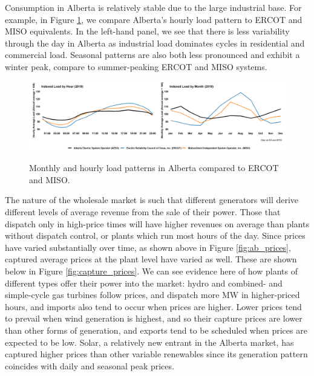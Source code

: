 \documentclass[12pt]{article}
\begin{document}
Consumption in Alberta is relatively stable due to the large industrial base. For example, in Figure \ref{fig:load_pattern}, we compare Alberta's hourly load pattern to ERCOT and MISO equivalents. In the left-hand panel, we see that there is less variability through the day in Alberta as industrial load dominates cycles in residential and commercial load. Seasonal patterns are also both less pronounced and exhibit a winter peak, compare to summer-peaking ERCOT and MISO systems.

\begin{figure}[!h]%
	\centering \vspace{-.25cm} \includegraphics[width=6.5in]{images/load_compare.png}
\label{fig:load_pattern}
\vspace{-0.75cm}	\caption{Monthly and hourly load patterns in Alberta compared to ERCOT and MISO.}
\end{figure}

The nature of the wholesale market is such that different generators will derive different levels of average revenue from the sale of their power. Those that dispatch only in high-price times will have higher revenues on average than plants without dispatch control, or plants which run most hours of the day. Since prices have varied substantially over time, as shown above in Figure \ref{fig:ab_prices}, captured average prices at the plant level have varied as well. These are shown below in Figure \ref{fig:capture_prices}. We can see evidence here of how plants of different types offer their power into the market: hydro and combined- and simple-cycle gas turbines follow prices, and dispatch more MW in higher-priced hours, and imports also tend to occur when prices are higher. Lower prices tend to prevail when wind generation is highest, and so their capture prices are lower than other forms of generation, and exports tend to be scheduled when prices are expected to be low. Solar, a relatively new entrant in the Alberta market, has captured higher prices than other variable renewables since its generation pattern coincides with daily and seasonal peak prices.
\end{document}
